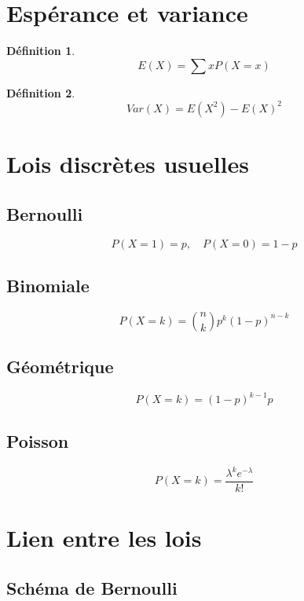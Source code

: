 \documentclass[11pt,a4paper]{article}
\newtheorem{definition}{Définition}
\begin{document}
\section{Espérance et variance}

\begin{definition}
\[
E(X)=\sum xP(X=x)
\]
\end{definition}

\begin{definition}
\[
Var(X)=E(X^2)-E(X)^2
\]
\end{definition}

\section{Lois discrètes usuelles}

\subsection{Bernoulli}

\[
P(X=1)=p,\quad P(X=0)=1-p
\]

\subsection{Binomiale}

\[
P(X=k)=\binom{n}{k}p^k(1-p)^{n-k}
\]

\subsection{Géométrique}

\[
P(X=k)=(1-p)^{k-1}p
\]

\subsection{Poisson}

\[
P(X=k)=\frac{\lambda^k e^{-\lambda}}{k!}
\]

\section{Lien entre les lois}

\subsection{Schéma de Bernoulli}
\end{document}
